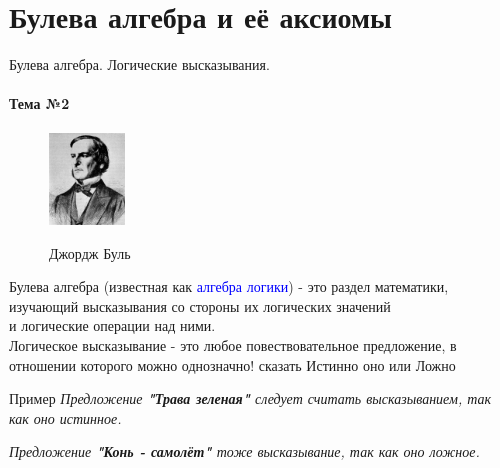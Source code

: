 \documentclass[aspectratio=169]{beamer}
\newcommand{\blu}{\textcolor{blue}}
\newcommand{\zag}{\huge\alert}
\newcommand{\n}{\normalsize}
\begin{document}
\section{Булева алгебра и её аксиомы}
\begin{frame}{Булева алгебра. Логические высказывания.}
\framesubtitle{Тема №2}
    \begin{figure}
\vspace{-2em}%
    \includegraphics[width=2cm]{george.jpg}
    
    \scriptsize Джордж Буль
    \end{figure}

     \zag{Булева алгебра} \n(известная как \blu{алгебра логики}) - это раздел математики, изучающий \alert{высказывания} со стороны их логических значений\\ и логические операции над ними.\\
        \vspace{10pt}
    \alert{Логическое высказывание} - это любое повествовательное предложение, в отношении которого можно \alert{однозначно!} сказать \alert{Истинно} оно или \alert{Ложно}\\
    \vspace{10pt}
    
\begin{exampleblock}{Пример}
    \footnotesize 
    \textit{Предложение \textbf{"Трава зеленая"} следует считать высказыванием, так как оно \alert{истинное}.}

\textit{Предложение \textbf{"Конь - самолёт"} тоже высказывание, так как оно \alert{ложное}.}
\end{exampleblock}

\end{frame}
\end{document}
